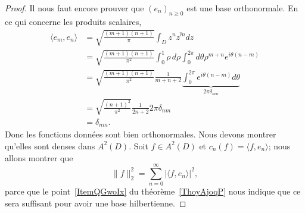 \begin{proof}
    Il nous faut encore prouver que \( (e_n)_{n\geq 0}\) est une base orthonormale. En ce qui concerne les produits scalaires,
    \begin{subequations}
        \begin{align}
            \langle e_m, e_n\rangle &=\sqrt{\frac{ (m+1)(n+1) }{ \pi }}\int_Dz^n\overline{ z^m }dz\\
            &=\sqrt{\frac{ (m+1)(n+1) }{ \pi^2 }}\int_0^1\rho\,d\rho\int_0^{2\pi}d\theta \rho^{m+n} e^{i\theta(n-m)}\\
            &=\sqrt{\frac{ (m+1)(n+1) }{ \pi^2 }}\frac{1}{ m+n+2 }\underbrace{\int_{0}^{2\pi} e^{i\theta(n-m)}d\theta}_{2\pi \delta_{mn}}\\
            &=\sqrt{\frac{ (n+1)^2 }{ \pi^2 }}\frac{1}{ 2n+2 }2\pi \delta_{nm}\\
            &=\delta_{nm}.
        \end{align}
    \end{subequations}
    Donc les fonctions données sont bien orthonormales. Nous devons montrer qu'elles sont denses dans \( A^2(D)\). Soit \( f\in A^2(D)\) et \( c_n(f)=\langle f, e_n\rangle \); nous allons montrer que
    \begin{equation}
        \| f \|_2^2=\sum_{n=0}^{\infty}| \langle f, e_n\rangle  |^2,
    \end{equation}
    parce que le point~\ref{ItemQGwoIx} du théorème~\ref{ThoyAjoqP} nous indique que ce sera suffisant pour avoir une base hilbertienne.


\end{proof}
